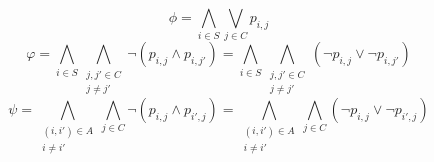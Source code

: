 \documentclass{article}
\begin{document}
$$\phi = \displaystyle\bigwedge_{i \in S}\displaystyle\bigvee_{j \in C} p_{i, j}$$
$$\varphi
  = \displaystyle\bigwedge_{i \in S}
    \bigwedge_{\substack{j, j' \in C \\
    j \neq j'}}
    \neg(p_{i,j} \land p_{i, j'})
  = \displaystyle\bigwedge_{i \in S}
    \bigwedge_{\substack{j, j' \in C \\
    j \neq j'}}
    (\neg p_{i,j} \lor \neg p_{i, j'})$$
$$\psi
  = \bigwedge_{\substack{(i, i') \in A \\
    i \neq i'}}
    \displaystyle\bigwedge_{j \in C}
    \neg(p_{i,j} \land p_{i', j})
  = \bigwedge_{\substack{(i, i') \in A \\
    i \neq i'}}
    \displaystyle\bigwedge_{j \in C}
    (\neg p_{i,j} \lor \neg p_{i', j})
    $$


\end{document}
